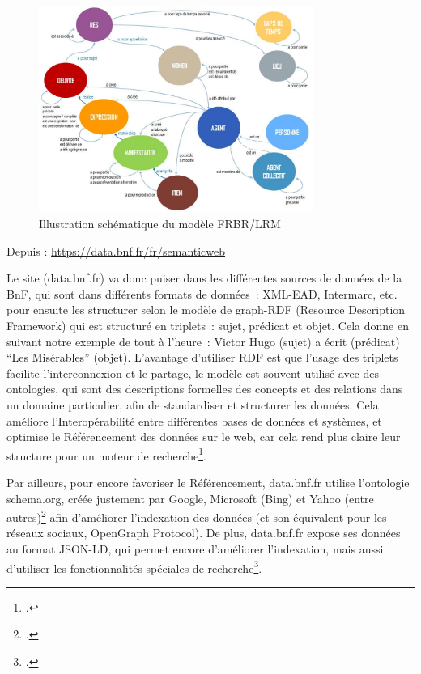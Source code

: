 \begin{figure}[h!]
	\centering
	\includegraphics[width=0.8\textwidth]{images/image3.jpg}
	\caption{Illustration schématique du modèle FRBR/LRM}
	\label{fig:image3}
\end{figure}

\begin{center}
	Depuis : \url{https://data.bnf.fr/fr/semanticweb}
\end{center}



Le site (data.bnf.fr) va donc puiser dans les différentes sources de données de la BnF, qui sont dans différents formats de données : XML-EAD, Intermarc, etc. pour ensuite les structurer selon le modèle de graph-RDF (Resource Description Framework) qui est structuré en triplets : sujet, prédicat et objet. Cela donne en suivant notre exemple de tout à l’heure : Victor Hugo (sujet) a écrit (prédicat) \enquote{Les Misérables} (objet). L’avantage d’utiliser RDF est que l’usage des triplets facilite l’interconnexion et le partage, le modèle est souvent utilisé avec des ontologies, qui sont des descriptions formelles des concepts et des relations dans un domaine particulier, afin de standardiser et structurer les données. Cela améliore l’Interopérabilité entre différentes bases de données et systèmes, et optimise le Référencement des données sur le web, car cela rend plus claire leur structure pour un moteur de recherche\footcite{zotero-238}.

Par ailleurs, pour encore favoriser le Référencement, data.bnf.fr utilise l’ontologie schema.org, créée justement par Google, Microsoft (Bing) et Yahoo (entre autres)\footcite{zotero-237} afin d’améliorer l’indexation des données (et son équivalent pour les réseaux sociaux, OpenGraph Protocol). De plus, data.bnf.fr expose ses données au format JSON-LD, qui permet encore d’améliorer l’indexation, mais aussi d’utiliser les fonctionnalités spéciales de recherche\footcite{zotero-236}.


